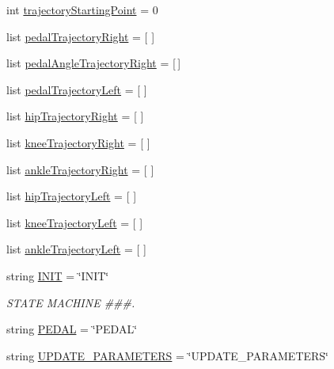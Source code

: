 \begin{DoxyCompactItemize}
int \mbox{\hyperlink{namespacejoint__angle__velocity__factor__test_aacb802079d565b0c439f3dd8e2da533e}{trajectory\+Starting\+Point}} = 0
\item 
list \mbox{\hyperlink{namespacejoint__angle__velocity__factor__test_a84eff6687be83c44fc35010c2b33da0c}{pedal\+Trajectory\+Right}} = \mbox{[} \mbox{]}
\item 
list \mbox{\hyperlink{namespacejoint__angle__velocity__factor__test_aec4d95c216baddd8bfc537b7480ffe91}{pedal\+Angle\+Trajectory\+Right}} = \mbox{[}$\,$\mbox{]}
\item 
list \mbox{\hyperlink{namespacejoint__angle__velocity__factor__test_ac2eee94a33690d825ecb1befd573a755}{pedal\+Trajectory\+Left}} = \mbox{[} \mbox{]}
\item 
list \mbox{\hyperlink{namespacejoint__angle__velocity__factor__test_a8936e94c3015e967b8257fdf9086679d}{hip\+Trajectory\+Right}} = \mbox{[} \mbox{]}
\item 
list \mbox{\hyperlink{namespacejoint__angle__velocity__factor__test_ab296187de6973499055863ea759c4c6b}{knee\+Trajectory\+Right}} = \mbox{[} \mbox{]}
\item 
list \mbox{\hyperlink{namespacejoint__angle__velocity__factor__test_a2824e2b76dbdd2cbefcc19f24f7f9a8b}{ankle\+Trajectory\+Right}} = \mbox{[} \mbox{]}
\item 
list \mbox{\hyperlink{namespacejoint__angle__velocity__factor__test_a923cc1684e869f1380e38815fb24361b}{hip\+Trajectory\+Left}} = \mbox{[} \mbox{]}
\item 
list \mbox{\hyperlink{namespacejoint__angle__velocity__factor__test_a02990b63d14919f3bccda54b5544e584}{knee\+Trajectory\+Left}} = \mbox{[} \mbox{]}
\item 
list \mbox{\hyperlink{namespacejoint__angle__velocity__factor__test_a9471d2eca07235e5d1641d739e9ece0b}{ankle\+Trajectory\+Left}} = \mbox{[} \mbox{]}
\item 
string \mbox{\hyperlink{namespacejoint__angle__velocity__factor__test_ad6bae7430fd20f038f1f8cf112c69a93}{I\+N\+IT}} = \char`\"{}I\+N\+IT\char`\"{}
\begin{DoxyCompactList}\small\item\em S\+T\+A\+TE M\+A\+C\+H\+I\+NE \#\#\#. \end{DoxyCompactList}\item 
string \mbox{\hyperlink{namespacejoint__angle__velocity__factor__test_a2d15e76e3f3f41b00c61bdee8c8b0c18}{P\+E\+D\+AL}} = \char`\"{}P\+E\+D\+AL\char`\"{}
\item 
string \mbox{\hyperlink{namespacejoint__angle__velocity__factor__test_a309d0aa259b2abad3913114b4cb6bacb}{U\+P\+D\+A\+T\+E\+\_\+\+P\+A\+R\+A\+M\+E\+T\+E\+RS}} = \char`\"{}U\+P\+D\+A\+T\+E\+\_\+\+P\+A\+R\+A\+M\+E\+T\+E\+RS\char`\"{}
\end{DoxyCompactItemize}


